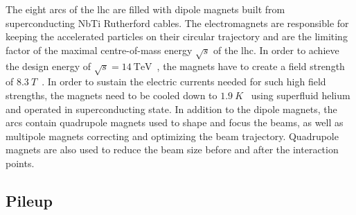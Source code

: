 The eight arcs of the \gls{lhc} are filled with dipole magnets built from superconducting NbTi Rutherford cables. The electromagnets are responsible for keeping the accelerated particles on their circular trajectory and are the limiting factor of the maximal centre-of-mass energy $\sqrt{s}$ of the \gls{lhc}. In order to achieve the design energy of $\sqrt{s} = \SI{14}{\TeV}$~\cite{Bruning:782076}, the magnets have to create a field strength of $\SI{8.3}{T}$~\cite{Evans:1129806}. In order to sustain the electric currents needed for such high field strengths, the magnets need to be cooled down to $\SI{1.9}{K}$~\cite{Evans:1129806} using superfluid helium and operated in superconducting state. In addition to the dipole magnets, the arcs contain quadrupole magnets used to shape and focus the beams, as well as multipole magnets correcting and optimizing the beam trajectory. Quadrupole magnets are also used to reduce the beam size before and after the interaction points.

\subsection{Pileup}

